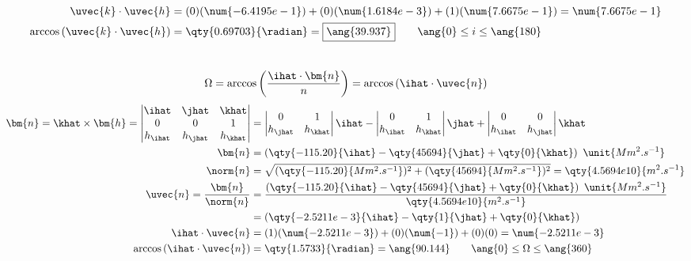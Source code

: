 \documentclass{article}
\begin{document}
{	\begin{equation*}
		\begin{split}
			\uvec{k} \cdot \uvec{h} &= (0)(\num{-6.4195e-1}) + (0)(\num{1.6184e-3}) + (1)(\num{7.6675e-1}) = \num{7.6675e-1} \\
			\arccos \left( \uvec{k} \cdot \uvec{h} \right) &= \qty{0.69703}{\radian} = \boxed{\ang{39.937}} \qquad \ang{0} \leq i \leq \ang{180}
		\end{split}
	\end{equation*} \\
	
	\[
		\Omega = \arccos \left( \frac{\ihat \cdot \bm{n}}{n} \right) = \arccos \left( \ihat \cdot \uvec{n} \right)
	\]
	\begin{equation*}
		\begin{split}
			\bm{n} = \khat \times \bm{h} =
			\begin{vmatrix}
				\ihat & \jhat & \khat \\
				0 & 0 & 1 \\
				h_{\ihat} & h_{\jhat} & h_{\khat}
			\end{vmatrix}
			&= \begin{vmatrix}
				0 & 1 \\
				h_{\jhat} & h_{\khat}
			\end{vmatrix} \ihat
			- \begin{vmatrix}
				0 & 1 \\
				h_{\ihat} & h_{\khat}
			\end{vmatrix} \jhat
			+ \begin{vmatrix}
				0 & 0 \\
				h_{\ihat} & h_{\jhat}
			\end{vmatrix} \khat \\
			\bm{n} &= \left( \qty{-115.20}{\ihat} - \qty{45694}{\jhat} + \qty{0}{\khat} \right) \ \unit{Mm^2.s^{-1}} \\
			\norm{n} &= \sqrt{(\qty{-115.20}{Mm^2.s^{-1}})^2 + (\qty{45694}{Mm^2.s^{-1}})^2} = \qty{4.5694e10}{m^2.s^{-1}} \\
			\uvec{n} = \frac{\bm{n}}{\norm{n}} &= \frac{\left( \qty{-115.20}{\ihat} - \qty{45694}{\jhat} + \qty{0}{\khat} \right) \ \unit{Mm^2.s^{-1}}}{\qty{4.5694e10}{m^2.s^{-1}}} \\
			&= \left( \qty{-2.5211e-3}{\ihat} - \qty{1}{\jhat} + \qty{0}{\khat} \right) \\
			\ihat \cdot \uvec{n} &= (1)(\num{-2.5211e-3}) + (0)(\num{-1}) + (0)(0) = \num{-2.5211e-3} \\
			\arccos \left( \ihat \cdot \uvec{n} \right) &= \qty{1.5733}{\radian} = \ang{90.144} \qquad \ang{0} \leq \Omega \leq \ang{360}
		\end{split}
	\end{equation*}
	
}
\end{document}
